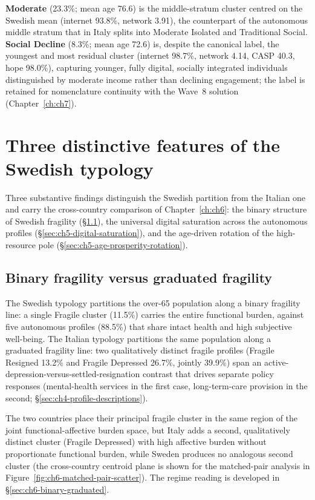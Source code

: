 \textbf{Moderate} (23.3\%; mean age 76.6) is the middle-stratum cluster centred on the Swedish mean (internet 93.8\%, network 3.91), the counterpart of the autonomous middle stratum that in Italy splits into Moderate Isolated and Traditional Social. \textbf{Social Decline} (8.3\%; mean age 72.6) is, despite the canonical label, the youngest and most residual cluster (internet 98.7\%, network 4.14, CASP 40.3, hope 98.0\%), capturing younger, fully digital, socially integrated individuals distinguished by moderate income rather than declining engagement; the label is retained for nomenclature continuity with the Wave~8 solution (Chapter~\ref{ch:ch7}).

\section{Three distinctive features of the Swedish typology}
\label{sec:ch5-distinctive-features}

Three substantive findings distinguish the Swedish partition from the Italian one and carry the cross-country comparison of Chapter~\ref{ch:ch6}: the binary structure of Swedish fragility (\S\ref{sec:ch5-binary-fragility}), the universal digital saturation across the autonomous profiles (\S\ref{sec:ch5-digital-saturation}), and the age-driven rotation of the high-resource pole (\S\ref{sec:ch5-age-prosperity-rotation}).

\subsection{Binary fragility versus graduated fragility}
\label{sec:ch5-binary-fragility}

The Swedish typology partitions the over-65 population along a binary fragility line: a single Fragile cluster (11.5\%) carries the entire functional burden, against five autonomous profiles (88.5\%) that share intact health and high subjective well-being. The Italian typology partitions the same population along a graduated fragility line: two qualitatively distinct fragile profiles (Fragile Resigned 13.2\% and Fragile Depressed 26.7\%, jointly 39.9\%) span an active-depression-versus-settled-resignation contrast that drives separate policy responses (mental-health services in the first case, long-term-care provision in the second; \S\ref{sec:ch4-profile-descriptions}).

The two countries place their principal fragile cluster in the same region of the joint functional-affective burden space, but Italy adds a second, qualitatively distinct cluster (Fragile Depressed) with high affective burden without proportionate functional burden, while Sweden produces no analogous second cluster (the cross-country centroid plane is shown for the matched-pair analysis in Figure~\ref{fig:ch6-matched-pair-scatter}). The regime reading is developed in \S\ref{sec:ch6-binary-graduated}.

